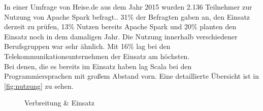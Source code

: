 \noindent
In einer Umfrage von Heise.de aus dem Jahr 2015 wurden 2.136 Teilnehmer zur Nutzung von Apache Spark befragt.\cite{HEISEBIGDATA}. 31\% der Befragten gaben an, den Einsatz derzeit zu prüfen, 13\% Nutzen bereits Apache Spark und 20\% planten den Einsatz noch in dem damaligen Jahr. Die Nutzung innerhalb verschiedener Berufsgruppen war sehr ähnlich. Mit 16\%  lag bei den Telekommunikationsunternehmen der Einsatz am höchsten.\\
Bei denen, die es bereits im Einsatz haben lag Scala bei den Programmiersprachen mit großem Abstand vorn. Eine detaillierte Übersicht ist in \autoref{fig:nutzung} zu sehen.
\begin{figure}[h]
  \centering
  \caption{Verbreitung \& Einsatz}\label{fig:nutzung}
\end{figure}
